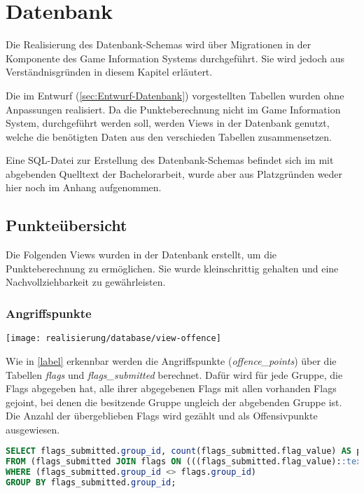 \section{Datenbank}

Die Realisierung des Datenbank-Schemas wird über Migrationen in der Komponente des Game Information Systems durchgeführt. Sie wird jedoch aus Verständnisgründen in diesem Kapitel erläutert.

Die im Entwurf (\autoref{sec:Entwurf-Datenbank}) vorgestellten Tabellen wurden ohne Anpassungen realisiert. Da die Punkteberechnung nicht im Game Information System, durchgeführt werden soll, werden Views in der Datenbank genutzt, welche die benötigten Daten aus den verschieden Tabellen zusammensetzen.

Eine SQL-Datei zur Erstellung des Datenbank-Schemas befindet sich im mit abgebenden Quelltext der Bachelorarbeit, wurde aber aus Platzgründen weder hier noch im Anhang aufgenommen.

\subsection{Punkteübersicht}
Die Folgenden Views wurden in der Datenbank erstellt, um die Punkteberechnung zu ermöglichen. Sie wurde kleinschrittig gehalten und eine Nachvollziehbarkeit zu gewährleisten.

\subsubsection{Angriffspunkte}\label{subsubsec:Angriffspunkte}
\begin{center}
	\texttt{[image: realisierung/database/view-offence]}
	\label{fig:realisierung-view-offence}
\end{center}

Wie in \autoref{label} erkennbar werden die Angriffspunkte (\textit{offence\_points}) über die Tabellen \textit{flags} und \textit{flags\_submitted} berechnet. Dafür wird für jede Gruppe, die Flags abgegeben hat, alle ihrer abgegebenen Flags mit allen vorhanden Flags gejoint, bei denen die besitzende Gruppe ungleich der abgebenden Gruppe ist. Die Anzahl der übergeblieben Flags wird gezählt und als Offensivpunkte ausgewiesen.

\begin{lstlisting}[frame=single, language=sql, caption={SQL View Angriffspunkte}, captionpos=b, label={lst:database-offence-points}]
SELECT flags_submitted.group_id, count(flags_submitted.flag_value) AS points
FROM (flags_submitted JOIN flags ON (((flags_submitted.flag_value)::text = (flags.flag_value)::text)))
WHERE (flags_submitted.group_id <> flags.group_id)
GROUP BY flags_submitted.group_id;
\end{lstlisting}

